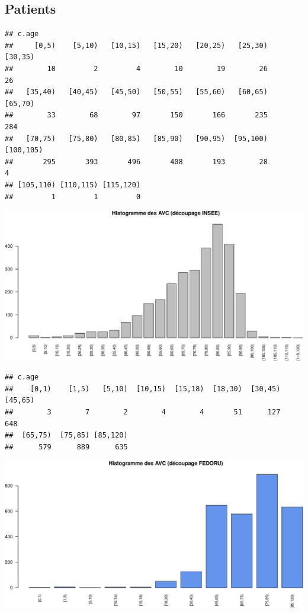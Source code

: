 \documentclass[]{article}
\begin{document}
\subsection{Patients}\label{patients-3}

\begin{verbatim}
## c.age
##     [0,5)    [5,10)   [10,15)   [15,20)   [20,25)   [25,30)   [30,35) 
##        10         2         4        10        19        26        26 
##   [35,40)   [40,45)   [45,50)   [50,55)   [55,60)   [60,65)   [65,70) 
##        33        68        97       150       166       235       284 
##   [70,75)   [75,80)   [80,85)   [85,90)   [90,95)  [95,100) [100,105) 
##       295       393       496       408       193        28         4 
## [105,110) [110,115) [115,120) 
##         1         1         0
\end{verbatim}

\includegraphics{Figs/Patients-1.pdf}

\begin{verbatim}
## c.age
##    [0,1)    [1,5)   [5,10)  [10,15)  [15,18)  [18,30)  [30,45)  [45,65) 
##        3        7        2        4        4       51      127      648 
##  [65,75)  [75,85) [85,120) 
##      579      889      635
\end{verbatim}

\includegraphics{Figs/Patients-2.pdf}
\end{document}
